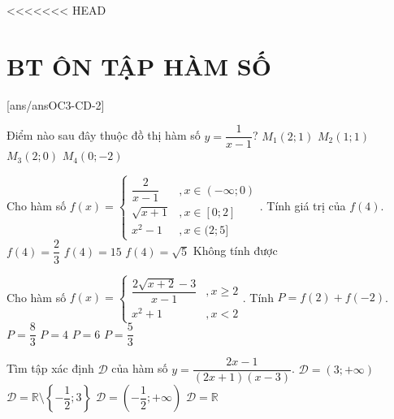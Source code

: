 <<<<<<< HEAD
\section*{BT ÔN TẬP HÀM SỐ}
\setcounter{ex}{0}\setcounter{bt}{0}
[ans/ansOC3-CD-2]

\begin{ex}%
    Điểm nào sau đây thuộc đồ thị hàm số $y=\dfrac{1}{x-1}$?
    \choice
    {\True $M_1(2;1)$}
    {$M_2(1;1)$}
    {$M_3(2;0)$}
    {$M_4(0;-2)$}
\end{ex}

\begin{ex}%
    Cho hàm số $f(x)=\left\{\begin{array}{*{35}{l}}
    \dfrac{2}{x-1} &, x\in(-\infty;0) \\
    \sqrt{x+1} &, x\in[0;2] \\
    x^2-1 &, x\in(2;5]
    \end{array}\right.$. Tính giá trị của $f(4)$.
    \choice
    {$f(4)=\dfrac{2}{3}$}
    {\True $f(4)=15$}
    {$f(4)=\sqrt{5}$}
    {Không tính được}
    \loigiai{Do $4\in(2;5]$ nên $f(4)=4^2-1=15$.}
\end{ex}

\begin{ex}%
    Cho hàm số $f(x)=\left\{\begin{array}{*{35}{l}}
    \dfrac{2\sqrt{x+2}-3}{x-1} &, x\ge 2 \\
    x^2 +1 &, x<2
    \end{array}\right.$. Tính $P=f(2)+f(-2)$.
    \choice
    {$P=\dfrac{8}{3}$}
    {$P=4$}
    {\True $P=6$}
    {$P=\dfrac{5}{3}$}
\end{ex}

\begin{ex}%
    Tìm tập xác định $\mathscr{D}$ của hàm số $y=\dfrac{2x-1}{(2x+1)(x-3)}$.
    \choice
    {$\mathscr{D}=(3;+\infty)$}
    {\True $\mathscr{D}=\mathbb{R}\setminus\left\{-\dfrac{1}{2};3\right\}$}
    {$\mathscr{D}=\left(-\dfrac{1}{2};+\infty\right)$}
    {$\mathscr{D}=\mathbb{R}$}
\end{ex}

